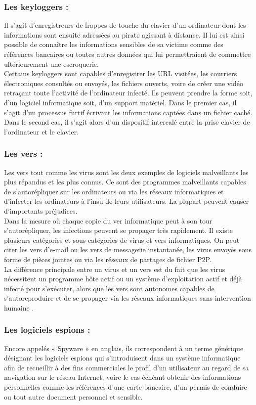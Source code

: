 \subsubsection{Les keyloggers : }
Il s’agit d’enregistreurs de frappes de touche du clavier d’un ordinateur dont les informations sont ensuite adressées au pirate agissant à distance. Il lui est ainsi possible de connaître les informations sensibles de sa victime comme des références bancaires ou toutes autres données qui lui permettraient de commettre ultérieurement une escroquerie.\\

Certains keyloggers sont capables d’enregistrer les URL visitées, les courriers électroniques consultés ou envoyés, les fichiers ouverts, voire de créer une vidéo retraçant toute l’activité de l’ordinateur infecté. Ils peuvent prendre la forme soit, d’un logiciel informatique soit, d’un support matériel. Dans le premier cas, il s’agit d’un processus furtif écrivant les informations captées dans un fichier caché. Dans le second cas, il s’agit alors d’un dispositif intercalé entre la prise clavier de l’ordinateur et le clavier.
\subsubsection{Les vers : }
Les vers tout comme les virus sont les deux exemples de logiciels malveillants les plus répandus et les plus connus. Ce sont des programmes malveillants capables de s’autorépliquer sur les ordinateurs ou via les réseaux informatiques et d’infecter les ordinateurs à l’insu de leurs utilisateurs. La plupart peuvent causer d’importants préjudices.\\

Dans la mesure où chaque copie du ver informatique peut à son tour s’autorépliquer, les infections peuvent se propager très rapidement. Il existe plusieurs catégories et sous-catégories de virus et vers informatiques. On peut citer les vers d’e-mail ou les vers de messagerie instantanée, les virus envoyés sous forme de pièces jointes ou via les réseaux de partages de fichier P2P.\\

La différence principale entre un virus et un vers est du fait que les virus nécessitent un programme hôte actif ou un système d’exploitation actif et déjà infecté pour s’exécuter, alors que les vers sont autonomes capables de s’autoreproduire et de se propager via les réseaux informatiques sans intervention humaine \cite{ref13}.
\subsubsection{Les logiciels espions : }
Encore appelés « Spyware » en anglais, ils correspondent à un terme générique désignant les logiciels espions qui s’introduisent dans un système informatique afin de recueillir à des fins commerciales le profil d’un utilisateur au regard de sa navigation sur le réseau Internet, voire le cas échéant obtenir des informations personnelles comme les références d’une carte bancaire, d’un permis de conduire ou tout autre document personnel et sensible.\\

